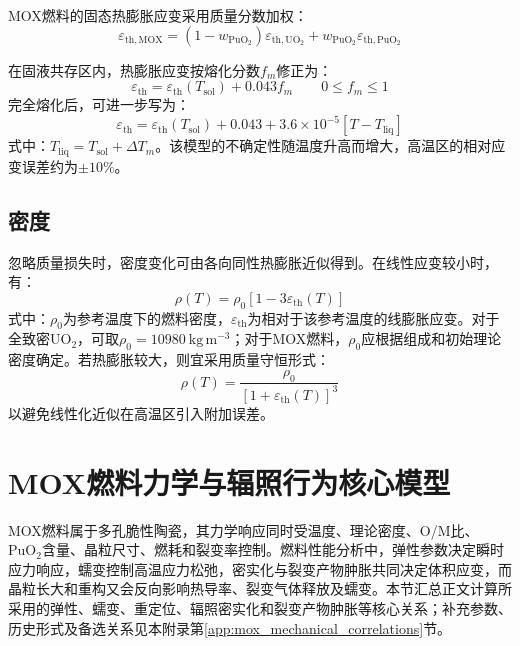 MOX燃料的固态热膨胀应变采用质量分数加权：
\begin{equation}
	\varepsilon_{\mathrm{th},\mathrm{MOX}}
	=(1-w_{\mathrm{PuO}_2})\varepsilon_{\mathrm{th},\mathrm{UO}_2}
	+w_{\mathrm{PuO}_2}\varepsilon_{\mathrm{th},\mathrm{PuO}_2}
	\label{eq:mox_solid_thermal_expansion}
\end{equation}

在固液共存区内，热膨胀应变按熔化分数$f_m$修正为：
\begin{equation}
	\varepsilon_{\mathrm{th}}
	=\varepsilon_{\mathrm{th}}(T_{\mathrm{sol}})+0.043f_m
	\qquad 0\leq f_m\leq1
	\label{eq:mox_partial_melting_expansion}
\end{equation}
完全熔化后，可进一步写为：
\begin{equation}
	\varepsilon_{\mathrm{th}}
	=\varepsilon_{\mathrm{th}}(T_{\mathrm{sol}})+0.043
	+3.6\times10^{-5}\left[T-T_{\mathrm{liq}}\right]
	\label{eq:mox_liquid_expansion}
\end{equation}
\noindent 式中：$T_{\mathrm{liq}}=T_{\mathrm{sol}}+\Delta T_m$。该模型的不确定性随温度升高而增大，高温区的相对应变误差约为$\pm10\%$。

\subsection{密度}

忽略质量损失时，密度变化可由各向同性热膨胀近似得到。在线性应变较小时，有：
\begin{equation}
	\rho(T)=\rho_0\left[1-3\varepsilon_{\mathrm{th}}(T)\right]
	\label{eq:mox_density_linearized}
\end{equation}
\noindent 式中：$\rho_0$为参考温度下的燃料密度，$\varepsilon_{\mathrm{th}}$为相对于该参考温度的线膨胀应变。对于全致密$\mathrm{UO}_2$，可取$\rho_0=10980\ \mathrm{kg\,m^{-3}}$；对于MOX燃料，$\rho_0$应根据组成和初始理论密度确定。若热膨胀较大，则宜采用质量守恒形式：
\begin{equation}
	\rho(T)=\frac{\rho_0}{\left[1+\varepsilon_{\mathrm{th}}(T)\right]^3}
	\label{eq:mox_density_exact}
\end{equation}
以避免线性化近似在高温区引入附加误差。

\section{MOX燃料力学与辐照行为核心模型}
\label{app:mox_core_mechanical_models}

MOX燃料属于多孔脆性陶瓷，其力学响应同时受温度、理论密度、O/M比、$\mathrm{PuO}_2$含量、晶粒尺寸、燃耗和裂变率控制。燃料性能分析中，弹性参数决定瞬时应力响应，蠕变控制高温应力松弛，密实化与裂变产物肿胀共同决定体积应变，而晶粒长大和重构又会反向影响热导率、裂变气体释放及蠕变。本节汇总正文计算所采用的弹性、蠕变、重定位、辐照密实化和裂变产物肿胀等核心关系；补充参数、历史形式及备选关系见本附录第\ref{app:mox_mechanical_correlations}节。


